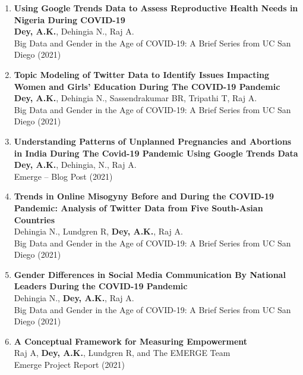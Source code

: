 \documentclass[11pt,letterpaper]{article}
\begin{document}
\begin{enumerate}
\item \textbf{Using Google Trends Data to Assess Reproductive Health Needs in Nigeria During COVID-19}\\
\textbf{Dey, A.K.}, Dehingia N., Raj A.\\
Big Data and Gender in the Age of COVID-19: A Brief Series from UC San Diego (2021) 

\item \textbf{Topic Modeling of Twitter Data to Identify Issues Impacting Women and Girls' Education During The COVID-19 Pandemic}\\
\textbf{Dey, A.K.}, Dehingia N., Sassendrakumar BR, Tripathi T, Raj A.\\
Big Data and Gender in the Age of COVID-19: A Brief Series from UC San Diego (2021) 

\item \textbf{Understanding Patterns of Unplanned Pregnancies and Abortions in India During The Covid-19 Pandemic Using Google Trends Data}\\
\textbf{Dey, A.K.}, Dehingia, N., Raj A.\\
Emerge – Blog Post (2021) 

\item \textbf{Trends in Online Misogyny Before and During the COVID-19 Pandemic: Analysis of Twitter Data from Five South-Asian Countries}\\
Dehingia N., Lundgren R, \textbf{Dey, A.K.}, Raj A.\\
Big Data and Gender in the Age of COVID-19: A Brief Series from UC San Diego (2021) 

\item \textbf{Gender Differences in Social Media Communication By National Leaders During the COVID-19 Pandemic}\\
Dehingia N., \textbf{Dey, A.K.}, Raj A.\\
Big Data and Gender in the Age of COVID-19: A Brief Series from UC San Diego (2021) 

\item \textbf{A Conceptual Framework for Measuring Empowerment}\\
Raj A, \textbf{Dey, A.K.}, Lundgren R, and The EMERGE Team\\
Emerge Project Report (2021) 
\end{enumerate}
\end{document}

